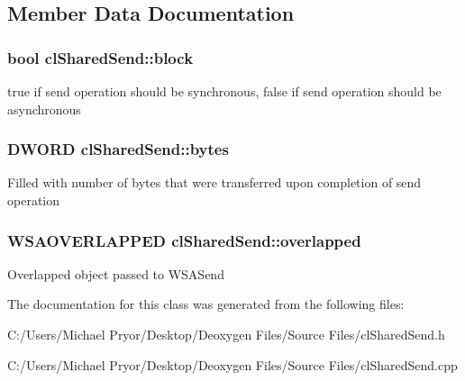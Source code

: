 \subsection{Member Data Documentation}
\hypertarget{classcl_shared_send_aaaf411d2405cc3447a3bc11fe2ab2678}{
\subsubsection[{block}]{\setlength{\rightskip}{0pt plus 5cm}bool {\bf clSharedSend::block}}}
\label{classcl_shared_send_aaaf411d2405cc3447a3bc11fe2ab2678}
true if send operation should be synchronous, false if send operation should be asynchronous \hypertarget{classcl_shared_send_a811a267109369803359a763066f8e5e2}{
\subsubsection[{bytes}]{\setlength{\rightskip}{0pt plus 5cm}DWORD {\bf clSharedSend::bytes}}}
\label{classcl_shared_send_a811a267109369803359a763066f8e5e2}
Filled with number of bytes that were transferred upon completion of send operation \hypertarget{classcl_shared_send_af20ae880d98268e62f8220e9410fd91e}{
\subsubsection[{overlapped}]{\setlength{\rightskip}{0pt plus 5cm}WSAOVERLAPPED {\bf clSharedSend::overlapped}}}
\label{classcl_shared_send_af20ae880d98268e62f8220e9410fd91e}
Overlapped object passed to WSASend 

The documentation for this class was generated from the following files:\begin{DoxyCompactItemize}
\item 
C:/Users/Michael Pryor/Desktop/Deoxygen Files/Source Files/clSharedSend.h\item 
C:/Users/Michael Pryor/Desktop/Deoxygen Files/Source Files/clSharedSend.cpp\end{DoxyCompactItemize}
